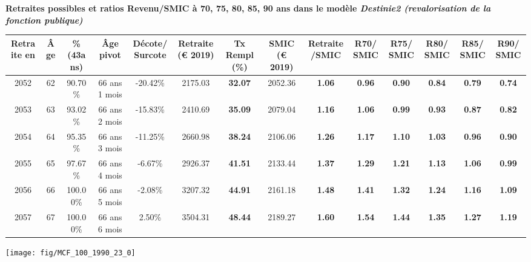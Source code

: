  \vspace{0.1cm} 
{\bf \noindent Retraites possibles et ratios Revenu/SMIC à 70, 75, 80, 85, 90 ans dans le modèle \emph{Destinie2 (revalorisation de la fonction publique)}}  
 
\begin{adjustbox}{max width=\textwidth} 
\begin{tabular}[htb]{|c|c||c|c|c||c|c||c|c||c|c|c|c|c|} 
\hline 
 Retraite en &  Âge &  \%(43ans) &  Âge pivot &  Décote/Surcote &  Retraite (\euro{} 2019) &  Tx Rempl(\%) &  SMIC (\euro{} 2019) &  Retraite/SMIC &  R70/SMIC &  R75/SMIC &  R80/SMIC &  R85/SMIC &  R90/SMIC \\ 
\hline \hline 
 2052 &  62 &  90.70\% &  66 ans 1 mois &  -20.42\% &  2175.03 &  {\bf 32.07} &  2052.36 &  {\bf 1.06} &  {\bf {\color{red} 0.96}} &  {\bf {\color{red} 0.90}} &  {\bf {\color{red} 0.84}} &  {\bf {\color{red} 0.79}} &  {\bf {\color{red} 0.74}} \\ 
\hline 
 2053 &  63 &  93.02\% &  66 ans 2 mois &  -15.83\% &  2410.69 &  {\bf 35.09} &  2079.04 &  {\bf 1.16} &  {\bf 1.06} &  {\bf {\color{red} 0.99}} &  {\bf {\color{red} 0.93}} &  {\bf {\color{red} 0.87}} &  {\bf {\color{red} 0.82}} \\ 
\hline 
 2054 &  64 &  95.35\% &  66 ans 3 mois &  -11.25\% &  2660.98 &  {\bf 38.24} &  2106.06 &  {\bf 1.26} &  {\bf 1.17} &  {\bf 1.10} &  {\bf 1.03} &  {\bf {\color{red} 0.96}} &  {\bf {\color{red} 0.90}} \\ 
\hline 
 2055 &  65 &  97.67\% &  66 ans 4 mois &  -6.67\% &  2926.37 &  {\bf 41.51} &  2133.44 &  {\bf 1.37} &  {\bf 1.29} &  {\bf 1.21} &  {\bf 1.13} &  {\bf 1.06} &  {\bf {\color{red} 0.99}} \\ 
\hline 
 2056 &  66 &  100.00\% &  66 ans 5 mois &  -2.08\% &  3207.32 &  {\bf 44.91} &  2161.18 &  {\bf 1.48} &  {\bf 1.41} &  {\bf 1.32} &  {\bf 1.24} &  {\bf 1.16} &  {\bf 1.09} \\ 
\hline 
 2057 &  67 &  100.00\% &  66 ans 6 mois &  2.50\% &  3504.31 &  {\bf 48.44} &  2189.27 &  {\bf 1.60} &  {\bf 1.54} &  {\bf 1.44} &  {\bf 1.35} &  {\bf 1.27} &  {\bf 1.19} \\ 
\hline 
\hline 
\end{tabular} 
\end{adjustbox} 
 
 \vspace{0.1cm} 

 {\hspace{-2.2cm}\texttt{[image: fig/MCF\_100\_1990\_23\_0]}} 

